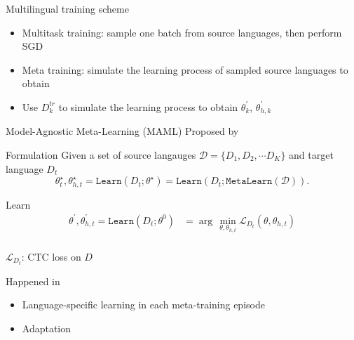 \documentclass{beamer}
\begin{document}
\begin{frame}[t]{Multilingual training scheme}
  \begin{itemize}
    \item Multitask training: sample one batch from source languages, then perform SGD
    \item Meta training: simulate the learning process of sampled source languages to obtain
    \item Use $D^{tr}_k$ to simulate the learning process to obtain $\theta^\prime_k$, $\theta^\prime_{h,k}$
  \end{itemize}
\end{frame}

\begin{frame}[t]{Model-Agnostic Meta-Learning (MAML)}
  Proposed by \citealt{finn2017model}
\end{frame}


\begin{frame}[t]{Formulation}
  Given a set of source langauges $\mathcal{D} = \{D_1, D_2, \cdots D_K \}$ and target language $D_t$
  \begin{equation*}
    \theta^{\star}_t, \theta^{\star}_{h,t} = \texttt{Learn}(D_t;\theta^{\star}) = \texttt{Learn}(D_t;\texttt{MetaLearn}(\mathcal{D})).
  \end{equation*}

\end{frame}

\begin{frame}[t]{Learn}
\begin{equation*}
  \begin{aligned}
    \theta^\prime, \theta^\prime_{h,t} = \texttt{Learn}(D_t;\theta^0) & = \arg \, \min_{\theta, \theta_{h,t}} \mathcal{L}_{D_t}(\theta, \theta_{h,t}) \\
  \end{aligned}
\end{equation*}
  \vspace{1em}

  $\mathcal{L}_{D_t}$: CTC loss on $D$

  \vspace{2em}
  Happened in 
  \begin{itemize}
    \item Language-specific learning in each meta-training episode
    \item Adaptation
  \end{itemize}
\end{frame}
\end{document}

